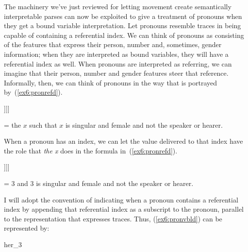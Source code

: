 The machinery we've just reviewed for letting movement create semantically interpretable parses can now be exploited to give a treatment of pronouns when they get a bound variable interpretation. Let pronouns resemble traces in being capable of containing a referential index. We can think of pronouns as consisting of the features that express their person, number and, sometimes, gender information; when they are interpreted as bound variables, they will have a referential index as well. When pronouns are interpreted as referring, we can imagine that their person, number and gender features steer that reference. Informally, then, we can think of pronouns in the way that is portrayed by~(\ref{ex6:pronrefd}).
\begin{exe}
\raggedright
	\ex \label{ex6:pronrefd}
	\footnotesize
	\begin{forest}
		[\denotes{DP} [\ibar{D} [\obar{D} [sing\\ \nth{3}\\ fem]]]]
	\end{forest}
= the $x$ such that $x$ is singular and female and not the speaker or hearer.
\end{exe}
When a pronoun has an index, we can let the value delivered to that index have the role that \emph{the x} does in the formula in~(\ref{ex6:pronrefd}).
\begin{exe}
\raggedright
	\ex \label{ex6:pronvbld}
	\footnotesize
	\begin{forest}
		[\denotes{DP} [\ibar{D} [\obar{D} [sing\\\nth{3}\\ fem\\ 3]]]]
	\end{forest}
= $3$ and $3$ is singular and female and not the speaker or hearer. 
\end{exe}
I will adopt the convention of indicating when a pronoun contains a referential index by appending that referential index as a subscript to the pronoun, parallel to the representation that expresses traces. Thus, (\ref{ex6:pronvbld}) can be represented by:
\begin{exe}
\raggedright
	\ex \label{ex6:pronsub}
	her_3
\end{exe}

